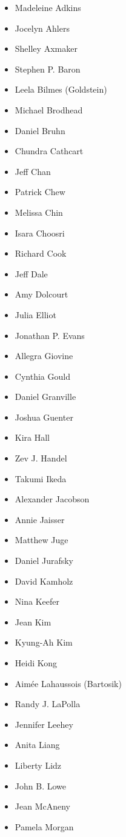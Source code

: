 \begin{multicols}{3}
\begin{itemize}
\item Madeleine Adkins
\item Jocelyn Ahlers
\item Shelley Axmaker
\item Stephen P. Baron
\item Leela Bilmes (Goldstein)
\item Michael Brodhead
\item Daniel Bruhn
\item Chundra Cathcart
\item Jeff Chan
\item Patrick Chew
\item Melissa Chin
\item Isara Choosri
\item Richard Cook
\item Jeff Dale
\item Amy Dolcourt
\item Julia Elliot
\item Jonathan P. Evans
\item Allegra Giovine
\item Cynthia Gould
\item Daniel Granville
\item Joshua Guenter
\item Kira Hall
\item Zev J. Handel
\item Takumi Ikeda
\item Alexander Jacobson
\item Annie Jaisser
\item Matthew Juge
\item Daniel Jurafsky
\item David Kamholz
\item Nina Keefer
\item Jean Kim
\item Kyung-Ah Kim
\item Heidi Kong
\item Aim\'ee Lahaussois (Bartosik)
\item Randy J. LaPolla
\item Jennifer Leehey
\item Anita Liang
\item Liberty Lidz
\item John B. Lowe
\item Jean McAneny
\item Pamela Morgan

\end{itemize}
\end{multicols}
